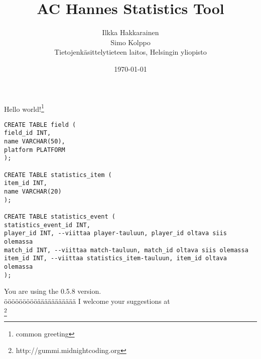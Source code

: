 \documentclass[titlepage, a4paper]{article}
\begin{document}
\begin{titlepage}
\title{AC Hannes Statistics Tool}
\author{Ilkka Hakkarainen\\
Simo Kolppo\\
Tietojenkäsittelytieteen laitos, Helsingin yliopisto}
\date{\today}
\maketitle
\end{titlepage}

\begin{center}
\Huge{Hello world!\footnote{common greeting}} \\
\begin{verbatim}
CREATE TABLE field (
field_id INT,
name VARCHAR(50),
platform PLATFORM
);

CREATE TABLE statistics_item (
item_id INT,
name VARCHAR(20)
);

CREATE TABLE statistics_event (
statistics_event_id INT,
player_id INT, --viittaa player-tauluun, player_id oltava siis olemassa
match_id INT, --viittaa match-tauluun, match_id oltava siis olemassa
item_id INT, --viittaa statistics_item-tauluun, item_id oltava olemassa
);
\end{verbatim}
\LARGE{You are using the 0.5.8 version.\\[10cm]
öööööööööäääääääääää
I welcome your suggestions at\\
\vfill
\footnote{http://gummi.midnightcoding.org}}\\
\end{center}
\end{document}
